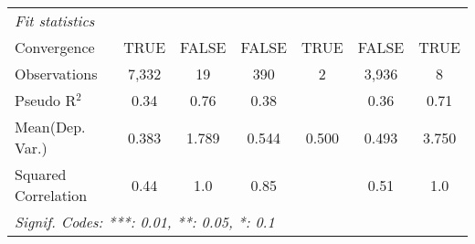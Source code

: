 \begin{tabular}{lcccccc}
   \midrule
   \emph{Fit statistics}\\
   Convergence                                                &TRUE        & FALSE         & FALSE         & TRUE & FALSE   & TRUE\\  
   Observations                                               & 7,332      & 19            & 390           & 2    & 3,936   & 8\\  
   Pseudo R$^2$                                               & 0.34       & 0.76          & 0.38          &      & 0.36    & 0.71\\  
Mean(Dep. Var.) & 0.383 & 1.789 & 0.544 & 0.500 & 0.493 & 3.750 \\
   Squared Correlation                                        & 0.44       & 1.0           & 0.85          &      & 0.51    & 1.0\\  
   \midrule \midrule
   \multicolumn{7}{l}{\emph{Signif. Codes: ***: 0.01, **: 0.05, *: 0.1}}\\
\end{tabular}
\par\endgroup
